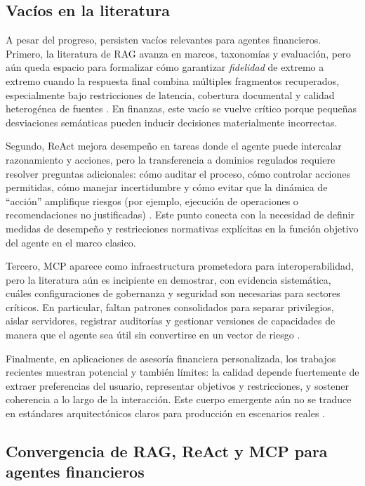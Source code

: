 \documentclass[
	spanish, %
	letterpaper, oneside
]{book}
\begin{document}
\subsection{Vacíos en la literatura}

A pesar del progreso, persisten vacíos relevantes para agentes financieros. Primero, la literatura de RAG avanza en marcos, taxonomías y evaluación, pero aún queda espacio para formalizar cómo garantizar \emph{fidelidad} de extremo a extremo cuando la respuesta final combina múltiples fragmentos recuperados, especialmente bajo restricciones de latencia, cobertura documental y calidad heterogénea de fuentes \cite{yu2024rag_survey}. En finanzas, este vacío se vuelve crítico porque pequeñas desviaciones semánticas pueden inducir decisiones materialmente incorrectas.

Segundo, ReAct mejora desempeño en tareas donde el agente puede intercalar razonamiento y acciones, pero la transferencia a dominios regulados requiere resolver preguntas adicionales: cómo auditar el proceso, cómo controlar acciones permitidas, cómo manejar incertidumbre y cómo evitar que la dinámica de “acción” amplifique riesgos (por ejemplo, ejecución de operaciones o recomendaciones no justificadas) \cite{yao2023react,russell2010aima}. Este punto conecta con la necesidad de definir medidas de desempeño y restricciones normativas explícitas en la función objetivo del agente en el marco clasico\cite{russell2010aima}.

Tercero, MCP aparece como infraestructura prometedora para interoperabilidad, pero la literatura aún es incipiente en demostrar, con evidencia sistemática, cuáles configuraciones de gobernanza y seguridad son necesarias para sectores críticos. En particular, faltan patrones consolidados para separar privilegios, aislar servidores, registrar auditorías y gestionar versiones de capacidades de manera que el agente sea útil sin convertirse en un vector de riesgo \cite{hou2025mcp}.

Finalmente, en aplicaciones de asesoría financiera personalizada, los trabajos recientes muestran potencial y también límites: la calidad depende fuertemente de extraer preferencias del usuario, representar objetivos y restricciones, y sostener coherencia a lo largo de la interacción. Este cuerpo emergente aún no se traduce en estándares arquitectónicos claros para producción en escenarios reales \cite{takayanagi2025generative}.

\subsection{Convergencia de RAG, ReAct y MCP para agentes financieros}
\end{document}
